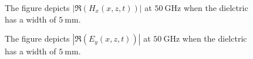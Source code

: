 \documentclass{article}
\begin{document}
\begin{figure}
  \centering
  \noindent{}
  \caption{The figure depicts $|\Re(H_x(x,z,t))|$ at $\SI{50}{\giga\hertz}$ when the dielctric has a width of $\SI{5}{\milli\metre}$.}
  \label{fig:h_z}
\end{figure}
\begin{figure}
  \centering
  \noindent{}
  \caption{The figure depicts $|\Re(E_y(x,z,t))|$ at $\SI{50}{\giga\hertz}$ when the dielctric has a width of $\SI{5}{\milli\metre}$.}
  \label{fig:h_z}
\end{figure}
\end{document}
